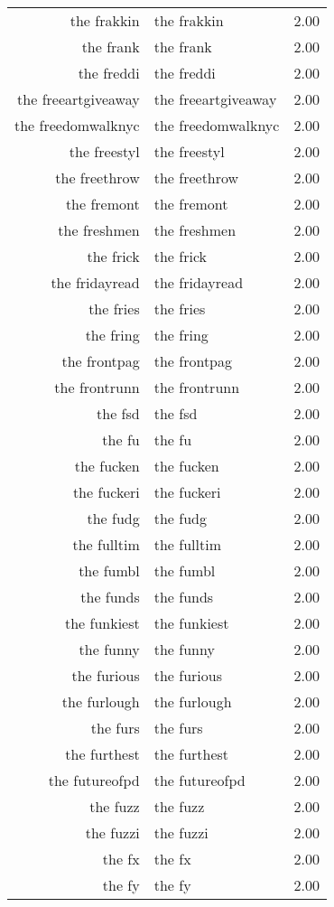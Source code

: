 \begin{table}[ht]
\begin{tabular}{rlr}
  the frakkin & the frakkin & 2.00 \\ 
  the frank & the frank & 2.00 \\ 
  the freddi & the freddi & 2.00 \\ 
  the freeartgiveaway & the freeartgiveaway & 2.00 \\ 
  the freedomwalknyc & the freedomwalknyc & 2.00 \\ 
  the freestyl & the freestyl & 2.00 \\ 
  the freethrow & the freethrow & 2.00 \\ 
  the fremont & the fremont & 2.00 \\ 
  the freshmen & the freshmen & 2.00 \\ 
  the frick & the frick & 2.00 \\ 
  the fridayread & the fridayread & 2.00 \\ 
  the fries & the fries & 2.00 \\ 
  the fring & the fring & 2.00 \\ 
  the frontpag & the frontpag & 2.00 \\ 
  the frontrunn & the frontrunn & 2.00 \\ 
  the fsd & the fsd & 2.00 \\ 
  the fu & the fu & 2.00 \\ 
  the fucken & the fucken & 2.00 \\ 
  the fuckeri & the fuckeri & 2.00 \\ 
  the fudg & the fudg & 2.00 \\ 
  the fulltim & the fulltim & 2.00 \\ 
  the fumbl & the fumbl & 2.00 \\ 
  the funds & the funds & 2.00 \\ 
  the funkiest & the funkiest & 2.00 \\ 
  the funny & the funny & 2.00 \\ 
  the furious & the furious & 2.00 \\ 
  the furlough & the furlough & 2.00 \\ 
  the furs & the furs & 2.00 \\ 
  the furthest & the furthest & 2.00 \\ 
  the futureofpd & the futureofpd & 2.00 \\ 
  the fuzz & the fuzz & 2.00 \\ 
  the fuzzi & the fuzzi & 2.00 \\ 
  the fx & the fx & 2.00 \\ 
  the fy & the fy & 2.00 \\ 

\end{tabular}
\end{table}
